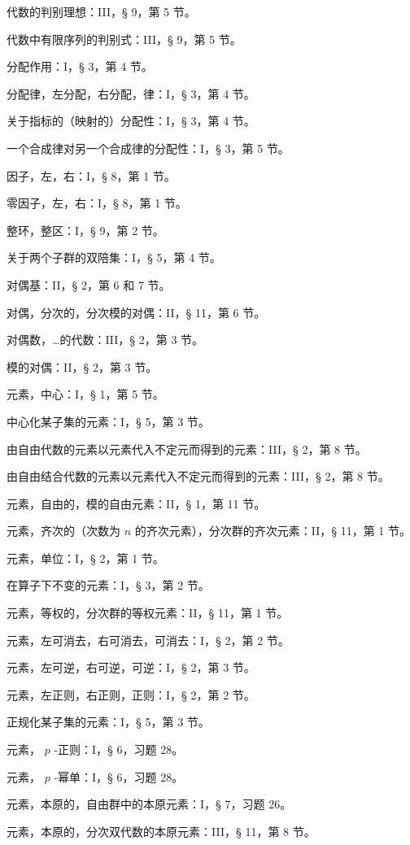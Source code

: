 代数的判别理想：III，§ 9，第 5 节。

代数中有限序列的判别式：III，§ 9，第 5 节。

分配作用：I，§ 3，第 4 节。

分配律，左分配，右分配，律：I，§ 3，第 4 节。

关于指标的（映射的）分配性：I，§ 3，第 4 节。

一个合成律对另一个合成律的分配性：I，§ 3，第 5 节。

因子，左，右：I，§ 8，第 1 节。

零因子，左，右：I，§ 8，第 1 节。

整环，整区：I，§ 9，第 2 节。

关于两个子群的双陪集：I，§ 5，第 4 节。

对偶基：II，§ 2，第 6 和 7 节。

对偶，分次的，分次模的对偶：II，§ 11，第 6 节。

对偶数，…的代数：III，§ 2，第 3 节。

模的对偶：II，§ 2，第 3 节。

元素，中心：I，§ 1，第 5 节。

中心化某子集的元素：I，§ 5，第 3 节。

由自由代数的元素以元素代入不定元而得到的元素：III，§ 2，第 8 节。

由自由结合代数的元素以元素代入不定元而得到的元素：III，§ 2，第 8 节。

元素，自由的，模的自由元素：II，§ 1，第 11 节。

元素，齐次的（次数为 \(n\) 的齐次元素），分次群的齐次元素：II，§ 11，第 1 节。

元素，单位：I，§ 2，第 1 节。

在算子下不变的元素：I，§ 3，第 2 节。

元素，等权的，分次群的等权元素：II，§ 11，第 1 节。

元素，左可消去，右可消去，可消去：I，§ 2，第 2 节。

元素，左可逆，右可逆，可逆：I，§ 2，第 3 节。

元素，左正则，右正则，正则：I，§ 2，第 2 节。

正规化某子集的元素：I，§ 5，第 3 节。

元素， \(p\) -正则：I，§ 6，习题 28。

元素， \(p\) -幂单：I，§ 6，习题 28。

元素，本原的，自由群中的本原元素：I，§ 7，习题 26。

元素，本原的，分次双代数的本原元素：III，§ 11，第 8 节。

